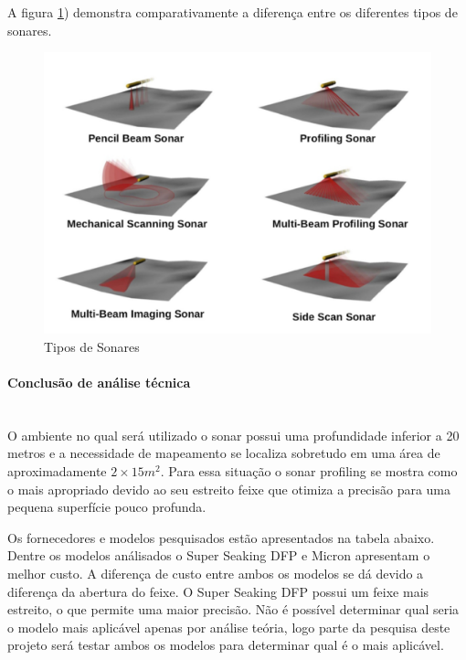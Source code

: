 A figura \ref{sonar_4}) demonstra comparativamente a diferença entre os diferentes tipos de sonares.

\begin{figure}[H]
    \centering
    \includegraphics[width=1\columnwidth]{figs/sonar/4.jpg}
    \caption{Tipos de Sonares}
    \label{sonar_4}
\end{figure}


 \paragraph{Conclusão de análise técnica}\mbox{}\\
 O ambiente no qual será utilizado o sonar possui uma profundidade inferior a 20
 metros e a necessidade de mapeamento se localiza sobretudo em uma área de
 aproximadamente $2 \times 15 m^2$. Para essa situação o sonar profiling se
 mostra como o mais apropriado devido ao seu estreito feixe que otimiza a
 precisão para uma pequena superfície pouco profunda. 

Os fornecedores e modelos pesquisados estão apresentados na tabela abaixo. Dentre os modelos análisados o Super Seaking DFP e Micron apresentam o melhor custo. A diferença de custo entre ambos os modelos se dá devido a diferença da abertura do feixe. O Super Seaking DFP possui um feixe mais estreito, o que permite uma maior precisão. Não é possível determinar qual seria o modelo mais aplicável apenas por análise teória, logo parte da pesquisa deste projeto será testar ambos os modelos para determinar qual é o mais aplicável.  


